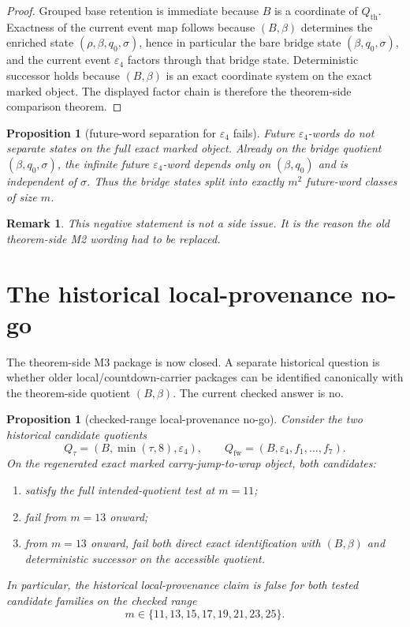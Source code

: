 \documentclass[11pt]{article}
\newtheorem{proposition}[theorem]{Proposition}
\newtheorem{remark}[theorem]{Remark}
\newcommand{\eps}{\varepsilon}
\begin{document}
\begin{proof}
Grouped base retention is immediate because $B$ is a coordinate of
$Q_{\mathrm{th}}$.
Exactness of the current event map follows because $(B,\beta)$ determines the
enriched state $(\rho,\beta,q_0,\sigma)$, hence in particular the bare bridge
state $(\beta,q_0,\sigma)$, and the current event $\eps_4$ factors through that
bridge state.
Deterministic successor holds because $(B,\beta)$ is an exact coordinate system
on the exact marked object.
The displayed factor chain is therefore the theorem-side comparison theorem.
\end{proof}

\begin{proposition}[future-word separation for $\eps_4$ fails]
\label{prop:future-word-fails}
Future $\eps_4$-words do not separate states on the full exact marked object.
Already on the bridge quotient $(\beta,q_0,\sigma)$, the infinite future
$\eps_4$-word depends only on $(\beta,q_0)$ and is independent of $\sigma$.
Thus the bridge states split into exactly $m^2$ future-word classes of size
$m$.
\end{proposition}

\begin{remark}
This negative statement is not a side issue. It is the reason the old theorem-side
M2 wording had to be replaced.
\end{remark}

\section{The historical local-provenance no-go}

The theorem-side M3 package is now closed. A separate historical question is
whether older local/countdown-carrier packages can be identified canonically
with the theorem-side quotient $(B,\beta)$. The current checked answer is no.

\begin{proposition}[checked-range local-provenance no-go]
\label{prop:provenance-no-go}
Consider the two historical candidate quotients
\[
Q_{\tau}=(B,\min(\tau,8),\eps_4),
\qquad
Q_{\mathrm{fw}}=(B,\eps_4,f_1,\dots,f_7).
\]
On the regenerated exact marked carry-jump-to-wrap object, both candidates:
\begin{enumerate}[label=\textup{(\alph*)},leftmargin=2.5em]
\item satisfy the full intended-quotient test at $m=11$;
\item fail from $m=13$ onward;
\item from $m=13$ onward, fail both direct exact identification with
      $(B,\beta)$ and deterministic successor on the accessible quotient.
\end{enumerate}
In particular, the historical local-provenance claim is false for both tested
candidate families on the checked range
\[
m\in\{11,13,15,17,19,21,23,25\}.
\]
\end{proposition}
\end{document}
